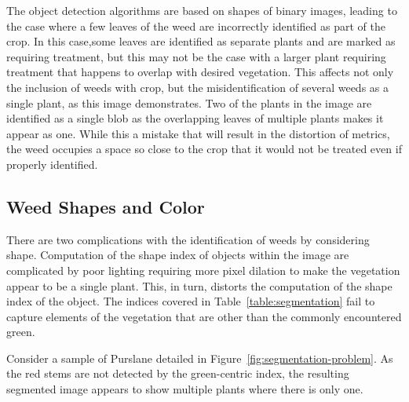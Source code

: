 \documentclass[letterpaper]{article}
\begin{document}
{The object detection algorithms are based on shapes of binary images, leading to the case where a few leaves of the weed are incorrectly identified as part of the crop. In this case,some leaves are identified as separate plants and are marked as requiring treatment, but this may not be the case with a larger plant requiring treatment that happens to overlap with desired vegetation. This affects not only the inclusion of weeds with crop, but the misidentification of several weeds as a single plant, as this image demonstrates.  Two of the plants in the image are identified as a single blob as the overlapping leaves of multiple plants makes it appear as one. While this a mistake that will result in the distortion of metrics, the weed occupies a space so close to the crop that it would not be treated even if properly identified.

\subsection{Weed Shapes and Color}
There are two complications with the identification of weeds by considering shape.  Computation of the shape index of objects within the image are complicated by poor lighting requiring more pixel dilation to make the vegetation appear to be a single plant. This, in turn, distorts the computation of the shape index of the object. The indices covered in Table~\ref{table:segmentation} fail to capture elements of the vegetation that are other than the commonly encountered green.

Consider a sample of Purslane detailed in Figure~\ref{fig:segmentation-problem}. As the red stems are not detected by the green-centric index, the resulting segmented image appears to show multiple plants where there is only one.

}
\end{document}
